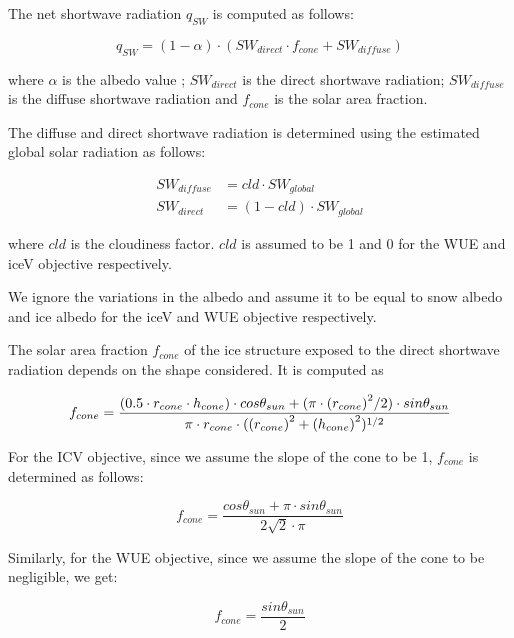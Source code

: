 \documentclass[tc, manuscript]{copernicus}
\begin{document}
The net shortwave radiation $q_{SW}$ is computed as follows:

\begin{equation} 
q_{SW} = (1- \alpha) \cdot ( SW_{direct} \cdot f_{cone} + SW_{diffuse})
\label{eqn:SW} 
\end{equation}

where $\alpha$ is the albedo value ; $SW_{direct}$ is the direct shortwave radiation; $SW_{diffuse}$ is the
diffuse shortwave radiation and $f_{cone}$ is the solar area fraction.

The diffuse and direct shortwave radiation is determined using the estimated global solar radiation as follows:

\begin{equation}
\begin{split}
  SW_{diffuse} &= cld \cdot SW_{global}\\
  SW_{direct} &= (1-cld) \cdot SW_{global}
\end{split}
\end{equation}

where $cld$ is the cloudiness factor. $cld$ is assumed to be 1 and 0 for the WUE and iceV objective
respectively.

We ignore the variations in the albedo and assume it to be equal to snow albedo and ice albedo for the iceV and
WUE objective respectively.

The solar area fraction $f_{cone}$ of the ice structure exposed to the direct shortwave radiation depends on the
shape considered. It is computed as

\begin{equation}
		f_{cone} =\frac{(0.5 \cdot r_{cone} \cdot h_{cone}) \cdot cos \theta_{sun} +(\pi \cdot
			{(r_{cone})}^2/2) \cdot sin \theta_{sun} }{\pi \cdot r_{cone} \cdot ({(r_{cone})}^2+{(h_{cone})}^2)^{1/2}}\\
\end{equation}

For the ICV objective, since we assume the slope of the cone to be 1, $f_{cone}$ is determined as follows:

\begin{equation}
		f_{cone} =\frac{ cos \theta_{sun} + \pi \cdot sin \theta_{sun} }{2\sqrt{2} \cdot \pi }
\end{equation}

Similarly, for the WUE objective, since we assume the slope of the cone to be negligible, we get:

\begin{equation}
		f_{cone} =\frac{ sin \theta_{sun} }{2 }
\end{equation}
\end{document}
